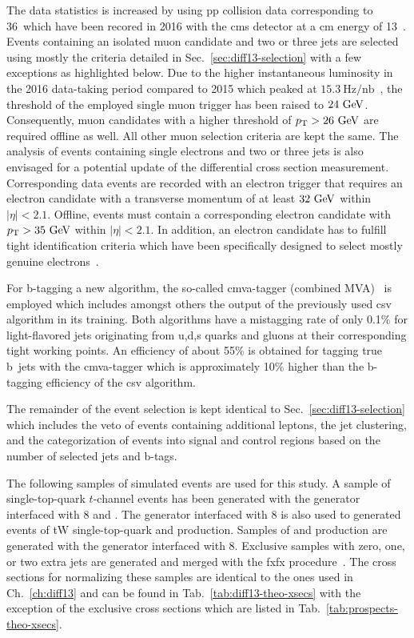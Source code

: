 The data statistics is increased by using \gls{pp} collision data corresponding to 36~\invfb which have been recored in 2016 with the \gls{cms} detector at a \acrlong{cm} energy of 13~\TeV. Events containing an isolated muon candidate and two or three jets are selected using mostly the criteria detailed in Sec.~\ref{sec:diff13-selection} with a few exceptions as highlighted below. Due to the higher instantaneous luminosity in the 2016 data-taking period compared to 2015 which peaked at $15.3~\mathrm{Hz}/\mathrm{nb}$~\cite{lumipublic}, the threshold of the employed single muon trigger has been raised to $24~\textrm{GeV}$. Consequently, muon candidates with a higher threshold of $p_\textrm{T}>26~\textrm{GeV}$ are required offline as well. All other muon selection criteria are kept the same. The analysis of events containing single electrons and two or three jets is also envisaged for a potential update of the differential cross section measurement. Corresponding data events are recorded with an electron trigger that requires an electron candidate with a transverse momentum of at least $32~\textrm{GeV}$ within $|\eta|<2.1$. Offline, events must contain a corresponding electron candidate with $p_\textrm{T}>35~\textrm{GeV}$ within $|\eta|<2.1$. In addition, an electron candidate has to fulfill tight identification criteria which have been specifically designed to select mostly genuine electrons~\cite{CMS-DP-2017-004}.

For b-tagging a new algorithm, the so-called \gls{cmva}-tagger (combined MVA)~\cite{CMS-PAS-BTV-15-001} is employed which includes amongst others the output of the previously used \gls{csv} algorithm in its training. Both algorithms have a mistagging rate of only 0.1\% for light-flavored jets originating from u,d,s quarks and gluons at their corresponding tight working points. An efficiency of about 55\% is obtained for tagging true b~jets with the \gls{cmva}-tagger which is approximately 10\% higher than the b-tagging efficiency of the \gls{csv} algorithm. 

The remainder of the event selection is kept identical to Sec.~\ref{sec:diff13-selection} which includes the veto of events containing additional leptons, the jet clustering, and the categorization of events into signal and control regions based on the number of selected jets and b-tags.

The following samples of simulated events are used for this study. A sample of single-top-quark $t$-channel events has been generated with the \POWHEG generator interfaced with \PYTHIA{}8 and \MADSPIN. The \POWHEG generator interfaced with \PYTHIA{}8 is also used to generated events of tW single-top-quark and \ttbar production. Samples of \wjets and \zjets production are generated with the \MGAMC generator interfaced with \PYTHIA{}8. Exclusive \wjets samples with zero, one, or two extra jets are generated and merged with the \gls{fxfx} procedure~\cite{Frederix:2012ps}. The cross sections for normalizing these samples are identical to the ones used in Ch.~\ref{ch:diff13} and can be found in Tab.~\ref{tab:diff13-theo-xsecs} with the exception of the exclusive \wjets cross sections which are listed in Tab.~\ref{tab:prospects-theo-xsecs}.

